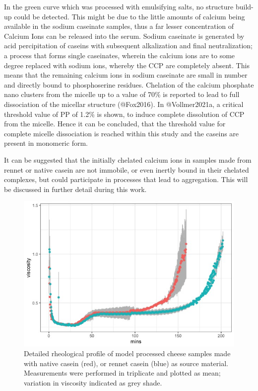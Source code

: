 \documentclass[
]{article}
\begin{document}
In the green curve which was processed with emulsifying salts, no
structure build-up could be detected. This might be due to the little
amounts of calcium being available in the sodium caseinate samples, thus
a far lesser concentration of Calcium Ions can be released into the
serum. Sodium caseinate is generated by acid percipitation of caseins
with subsequent alkalization and final neutralization; a process that
forms single caseinates, wherein the calcium ions are to some degree
replaced with sodium ions, whereby the CCP are completely absent. This
means that the remaining calcium ions in sodium caseinate are small in
number and directly bound to phosphoserine residues. Chelation of the
calcium phosphate nano clusters from the micelle up to a value of 70\%
is reported to lead to full dissociation of the micellar structure
(@Fox2016). In @Vollmer2021a, a critical threshold value of PP of 1.2\%
is shown, to induce complete dissolution of CCP from the micelle. Hence
it can be concluded, that the threshold value for complete micelle
dissociation is reached within this study and the caseins are present in
monomeric form.

It can be suggested that the initially chelated calcium ions in samples
made from rennet or native casein are not immobile, or even inertly
bound in their chelated complexes, but could participate in processes
that lead to aggregation. This will be discussed in further detail
during this work.

\begin{figure}
\includegraphics[width=0.75\linewidth]{plots/1.7_nat.ren.datail} \caption[Measured apparent viscosity of native and rennet casein]{Detailed rheological profile of model processed cheese samples made with native casein (red), or rennet casein (blue) as source material.  Measurements were performed in triplicate and plotted as mean; variation in viscosity indicated as grey shade.}\label{fig:unnamed-chunk-10}
\end{figure}
\end{document}
